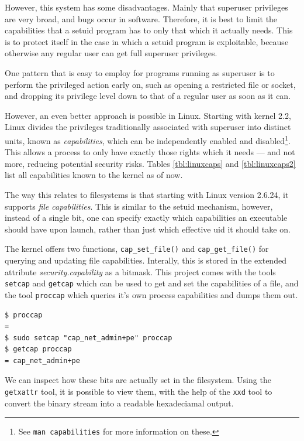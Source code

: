 \documentclass[a4paper]{article}
\begin{document}
However, this system has some disadvantages. Mainly that superuser privileges are very broad, and bugs occur in software. Therefore, it is best to limit the capabilities that a setuid program has to only that which it actually needs. This is to protect itself in the case in which a setuid program is exploitable, because otherwise any regular user can get full superuser privileges.

One pattern that is easy to employ for programs running as superuser is to perform the privileged action early on, such as opening a restricted file or socket, and dropping its privilege level down to that of a regular user as soon as it can. 

However, an even better approach is possible in Linux. Starting  with  kernel  2.2, Linux divides the privileges traditionally associated with superuser into distinct units, known as \emph{capabilities}, which can be independently enabled and disabled\footnote{See \texttt{man capabilities} for more information on these.}. This allows a process to only have exactly those rights which it needs — and not more, reducing potential security risks. Tables \ref{tbl:linuxcaps} and \ref{tbl:linuxcaps2} list all capabilities known to the kernel as of now.

The way this relates to filesystems is that starting with Linux version 2.6.24, it supports \emph{file capabilities}. This is similar to the setuid mechanism, however, instead of a single bit, one can specify exactly which capabilities an executable should have upon launch, rather than just which effective \gls{uid} it should take on. 

The kernel offers two functions, \verb|cap_set_file()| and \verb|cap_get_file()| for querying and updating file capabilities. Interally, this is stored in the extended attribute \emph{security.capability} as a bitmask. This project comes with the tools \verb|setcap| and \verb|getcap| which can be used to get and set the capabilities of a file, and the tool \verb|proccap| which queries it's own process capabilities and dumps them out.


\begin{verbatim}
$ proccap
=
$ sudo setcap "cap_net_admin+pe" proccap
$ getcap proccap
= cap_net_admin+pe
\end{verbatim}
We can inspect how these bits are actually set in the filesystem. Using the \verb|getxattr| tool, it is possible to view them, with the help of the \verb|xxd| tool to convert the binary stream into a readable hexadeciamal output.
\end{document}
